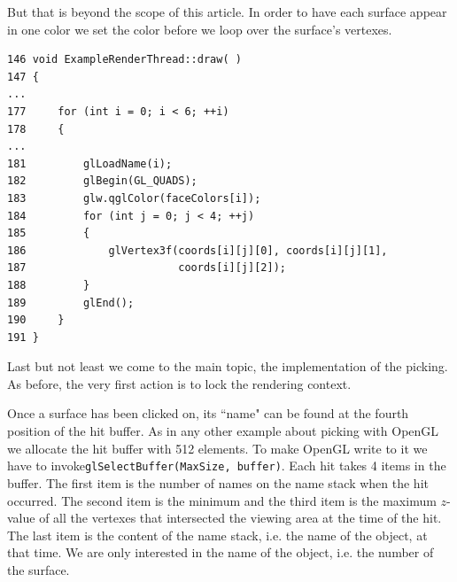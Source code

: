 \documentclass[prodmode,acmtopc]{acmsmall}
\begin{document}
%
But that is beyond the scope of this article.
%
In order to have each surface appear in one color we set the color before we loop over the surface's vertexes.
\begin{lstlisting}
146 void ExampleRenderThread::draw( )
147 {
...
177     for (int i = 0; i < 6; ++i)
178     {
...
181         glLoadName(i);
182         glBegin(GL_QUADS);
183         glw.qglColor(faceColors[i]);
184         for (int j = 0; j < 4; ++j)
185         {
186             glVertex3f(coords[i][j][0], coords[i][j][1],
187                        coords[i][j][2]);
188         }
189         glEnd();
190     }
191 }
\end{lstlisting}
%
Last but not least we come to the main topic, the implementation of the picking.
%
As before, the very first action is to lock the rendering context.

Once a surface has been clicked on, its ``name" can be found at the fourth position of the hit buffer.
%
As in any other example about picking with OpenGL we allocate the hit buffer with 512 elements.
%
To make OpenGL write to it we have to invoke\lstinline|glSelectBuffer(MaxSize, buffer)|.
 Each hit takes 4 items in the buffer.
%
 The first item is the number of names on the name stack when the hit occurred.
%
 The second item is the minimum and the third item is the maximum $z$-value of all the vertexes that intersected
 the viewing area at the time of the hit.
 The last item is the content of the name stack, i.e. the name of the object, at that time.
%
 We are only interested in the name of the object, i.e. the number of the surface.
\end{document}
